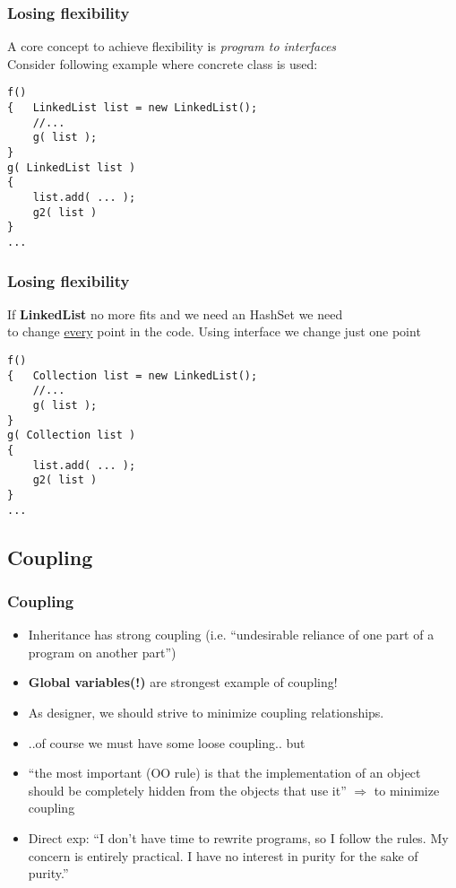 \documentclass{beamer}
\begin{document}
\begin{frame}[containsverbatim]
	\frametitle{Losing flexibility}
	A core concept to achieve flexibility is \textit{program to interfaces} \\
	Consider following example where concrete class is used:
	\begin{lstlisting}
f()
{   LinkedList list = new LinkedList();
    //...
    g( list );
}
g( LinkedList list )
{
    list.add( ... );
    g2( list )
}
...
\end{lstlisting}
\end{frame}

\begin{frame}[containsverbatim]
	\frametitle{Losing flexibility}
	If \textbf{LinkedList} no more fits and we need an HashSet we need   \\
	to change \underline{every} point in the code. Using interface we change just one point \\
	\begin{lstlisting}
f()
{   Collection list = new LinkedList();
    //...
    g( list );
}
g( Collection list )
{
    list.add( ... );
    g2( list )
}
...
\end{lstlisting}
\end{frame}

\subsection{Coupling}
\begin{frame}
  \frametitle{Coupling}
  \begin{itemize}
  		\item<+-> Inheritance has strong coupling (i.e. ``undesirable reliance of one part of a program on another part'')
		\item<+-> \textbf{Global variables(!)} are strongest example of coupling! 
		\item<+-> As designer, we should strive to minimize coupling relationships.
		\item<+-> ..of course we must have some loose coupling.. but
		\item<+-> ``the most important (OO rule) is that the implementation of an object should be completely hidden from the objects that use it'' $\Rightarrow$ to minimize coupling
		\item<+-> Direct exp: ``I don't have time to rewrite programs, so I follow the rules. My concern is entirely practical. I have no interest in purity for the sake of purity.''
  \end{itemize}
\end{frame}
\end{document}
